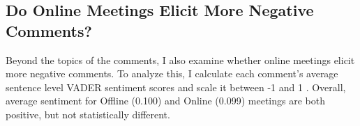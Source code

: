         \begin{table}[H]
        \centering
        \caption{School Board Topics of Online Versus Offline Comments}
        \label{tab:school_online_offline}
        
        \end{table}

        \subsection{Do Online Meetings Elicit More Negative Comments?}
        Beyond the topics of the comments, I also examine whether online meetings elicit more negative comments. To analyze this, I calculate each comment's average sentence level VADER sentiment scores and scale it between -1 and 1 \citep{Hutto_Gilbert_2014}. Overall, average sentiment for Offline (0.100) and Online (0.099) meetings are both positive, but not statistically different.


